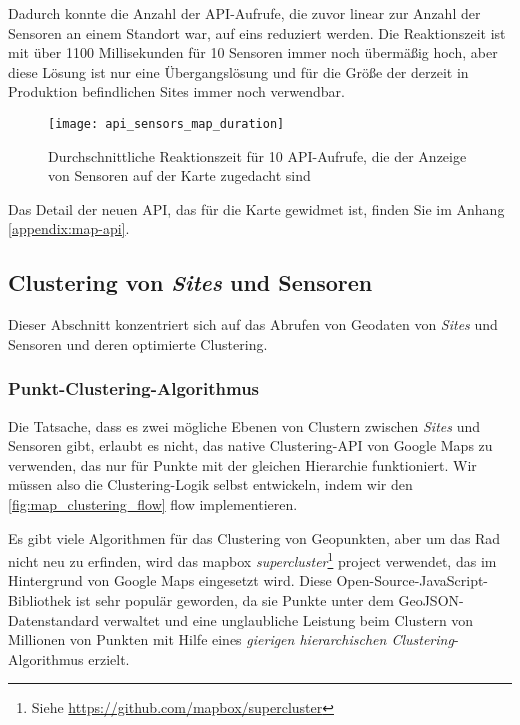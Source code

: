 Dadurch konnte die Anzahl der API-Aufrufe, die zuvor linear zur Anzahl der Sensoren an einem Standort war, auf eins reduziert werden.
Die Reaktionszeit ist mit über 1100 Millisekunden für 10 Sensoren immer noch übermäßig hoch, aber diese Lösung ist nur eine Übergangslösung und für die Größe der derzeit in Produktion befindlichen Sites immer noch verwendbar.

\begin{figure}[H]
  \centering
  \texttt{[image: api\_sensors\_map\_duration]}
  \caption{Durchschnittliche Reaktionszeit für 10 API-Aufrufe, die der Anzeige von Sensoren auf der Karte zugedacht sind}
  \label{fig:api_sensors_map_duration}
\end{figure}

Das Detail der neuen API, das für die Karte gewidmet ist, finden Sie im Anhang \ref{appendix:map-api}.

\subsection{Clustering von \textit{Sites} und Sensoren}

Dieser Abschnitt konzentriert sich auf das Abrufen von Geodaten von \textit{Sites} und Sensoren und deren optimierte Clustering.

\subsubsection{Punkt-Clustering-Algorithmus}

Die Tatsache, dass es zwei mögliche Ebenen von Clustern zwischen \textit{Sites} und Sensoren gibt, erlaubt es nicht, das native Clustering-API von Google Maps zu verwenden, das nur für Punkte mit der gleichen Hierarchie funktioniert.
Wir müssen also die Clustering-Logik selbst entwickeln, indem wir den \ref{fig:map_clustering_flow} flow implementieren.

Es gibt viele Algorithmen für das Clustering von Geopunkten, aber um das Rad nicht neu zu erfinden, wird das mapbox \textit{supercluster}\footnote{Siehe \href{https://github.com/mapbox/supercluster}{https://github.com/mapbox/supercluster}} project verwendet, das im Hintergrund von Google Maps eingesetzt wird.
Diese Open-Source-JavaScript-Bibliothek ist sehr populär geworden, da sie Punkte unter dem GeoJSON-Datenstandard\cite{rfc7946} verwaltet und eine unglaubliche Leistung beim Clustern von Millionen von Punkten mit Hilfe eines \textit{gierigen hierarchischen Clustering}-Algorithmus\cite{supercluster} erzielt.

